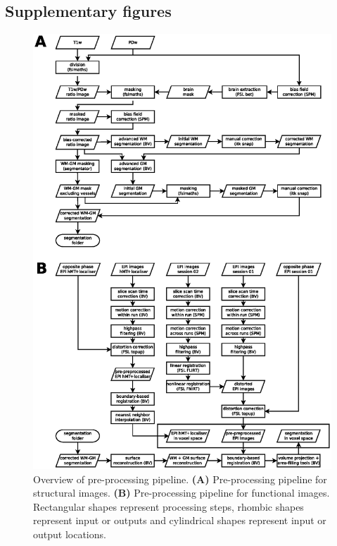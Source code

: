\beginsupplement

\clearpage
\subsection{Supplementary figures}

\begin{figure}[htbp!]
\centering
\includegraphics[width=\textwidth]{figures/chapter_03_SI/figS11.eps}
\caption{Overview of pre-processing pipeline. \textbf{(A)} Pre-processing pipeline for structural images. \textbf{(B)} Pre-processing pipeline for functional images. Rectangular shapes represent processing steps, rhombic shapes represent input or outputs and cylindrical shapes represent input or output locations.}
\label{fig:figAB_proc}
\end{figure}

